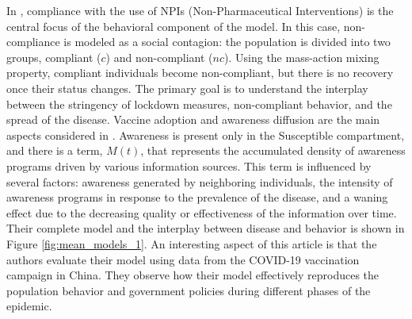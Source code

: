 In \cite{Bongarti2023}, compliance with the use of NPIs (Non-Pharmaceutical Interventions) is the central focus of the behavioral component of the model. In this case, non-compliance is modeled as a social contagion: the population is divided into two groups, compliant ($c$) and non-compliant ($nc$). Using the mass-action mixing property, compliant individuals become non-compliant, but there is no recovery once their status changes. The primary goal is to understand the interplay between the stringency of lockdown measures, non-compliant behavior, and the spread of the disease.
\label{par:Zou_par_2022}
Vaccine adoption and awareness diffusion are the main aspects considered in \cite{Zuo2022}. Awareness is present only in the Susceptible compartment, and there is a term, $M(t)$, that represents the accumulated density of awareness programs driven by various information sources. This term is influenced by several factors: awareness generated by neighboring individuals, the intensity of awareness programs in response to the prevalence of the disease, and a waning effect due to the decreasing quality or effectiveness of the information over time. Their complete model and the interplay between disease and behavior is shown in Figure  \ref{fig:mean_models_1}. 
An interesting aspect of this article is that the authors evaluate their model using data from the COVID-19 vaccination campaign in China. They observe how their model effectively reproduces the population behavior and government policies during different phases of the epidemic.

